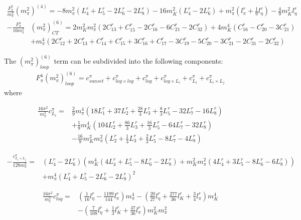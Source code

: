 \documentclass[12pt,a4paper]{article}
\begin{document}
\begin{align}
	\frac{F_{\pi}^2}{m_{\pi}^2} (m_{\pi}^2)^{(4)} = -8 m_{\pi}^2 (L^r_{4}+L^r_{5}-2 L^r_{6}-2 L^r_{8})-16 m_{K}^2 (L^r_{4}-2 L^r_{6})+m_{\pi}^2 \left(l^r_{\pi} + \frac{1}{9}l^r_{\eta} \right)-\frac{4}{9} m_{K}^2 l^r_{\eta} 
\end{align}
\begin{align}
	- \frac{F_{\pi}^4}{16 m_{\pi}^2} & (m_{\pi}^2)^{(6)}_{CT} = 2 m_{K}^2 m_{\pi}^2 (2 C^r_{13}+C^r_{15}-2 C^r_{16}-6 C^r_{21}-2 C^r_{32})+4 m_{K}^4 (C^r_{16}-C^r_{20}-3 C^r_{21})\nonumber \\
	& + m_{\pi}^4 (2 C^r_{12}+2 C^r_{13}+C^r_{14}+C^r_{15}+3 C^r_{16}+C^r_{17}-3 C^r_{19}-5 C^r_{20}-3 C^r_{21}-2 C^r_{31}-2 C^r_{32})
\end{align}

The $( m_{\pi}^2 )^{(6)}_{loop}$ term can be subdivided into the following components:
\begin{align}
	F_{\pi}^4 (m_{\pi}^2 )^{(6)}_{loop} = {c}^{\pi}_{sunset} + c^{\pi}_{log \times log} + c^{\pi}_{log} + c^{\pi}_{log \times L_i} + c^{\pi}_{L_i} + c^{\pi}_{L_i \times L_j}
\end{align}
where

\begin{align}
	\frac{16 \pi^2}{m_{\pi}^2}  c^{\pi}_{L_i} =& \frac{2}{9} m_{\pi}^4 \left(18 L^r_{1}+37 L^r_{2}+\frac{28}{3} L^r_{3} + \frac{8}{3} L^r_{5} - 32 L^r_{7} - 16 L^r_{8} \right) \nonumber \\
	& + \frac{1}{9} m_{K}^4 \left(104 L^r_{2}+\frac{86}{3} L^r_{3} + \frac{16}{3} L^r_{5} - 64 L^r_{7} - 32 L^r_{8}\right) \nonumber \\
	& -\frac{16}{9} m_{K}^2 m_{\pi}^2 \left(L^r_{2}+\frac{1}{3}L^r_{3} + \frac{2}{3} L^r_{5} - 8 L^r_{7} - 4 L^r_{8}\right)
\end{align}

\begin{align}
	- \frac{c^{\pi}_{L_i \times L_j}}{128 m_{\pi}^2} =& (L^r_{4}-2 L^r_{6}) \left(m_{K}^4 (4 L^r_{4}+L^r_{5}-8 L^r_{6}-2 L^r_{8})+m_{K}^2 m_{\pi}^2 (4 L^r_{4}+3 L^r_{5}-8 L^r_{6}-6 L^r_{8})\right) \nonumber \\
	& +m_{\pi}^4 (L^r_{4}+L^r_{5}-2 L^r_{6}-2 L^r_{8})^2 
\end{align}

\begin{align}
	\frac{16 \pi^2}{m_{\pi}^2} c^{\pi}_{log} =& \left(\frac{1}{16} l^r_{\eta} - \frac{1199}{144} l^r_{\pi} \right) m_{\pi}^4 -\left(\frac{20}{27} l^r_{\eta} + \frac{277}{36} l^r_{K} + \frac{3}{4} l^r_{\pi} \right) m_{K}^4 \nonumber \\
	& - \left(\frac{7}{108} l^r_{\eta} + \frac{1}{3} l^r_{K} + \frac{47}{36} l^r_{\pi} \right) m_{K}^2 m_{\pi}^2   \label{clogGMO}
\end{align}
\end{document}
